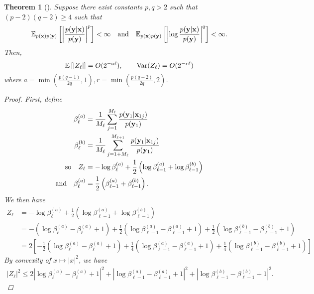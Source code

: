 \documentclass[a4paper, 10pt]{report}
\theoremstyle{plain}
\newtheorem{theorem}{Theorem}[chapter]
\begin{document}
	\begin{theorem}[\citet{goda2020multilevel}]\label{thm:mlmc}
		Suppose there exist constants $p,q>2$ such that $(p-2)(q-2) \ge 4$ such that
		\begin{equation}
		\mathbb{E}_{p({\mathbf{x}})p({\mathbf{y}})}\left[\left|\frac{p({\mathbf{y}}|{\mathbf{x}})}{p({\mathbf{y}})} \right|^p\right]<\infty \quad\text{and}\quad \mathbb{E}_{p({\mathbf{x}})p({\mathbf{y}})}\left[\left|\log \frac{p({\mathbf{y}}|{\mathbf{x}})}{p({\mathbf{y}})} \right|^q\right]<\infty.
		\end{equation}
		Then,
		\begin{equation}
		\mathbb{E}\left[\left|Z_\ell \right|\right] = O(2^{-a\ell}), \qquad \mathrm{Var}(Z_\ell) = O(2^{-r\ell})
		\end{equation}
		where $a = \min\left(\frac{p(q-1)}{2q}, 1 \right), r=\min\left(\frac{p(q-2)}{2q}, 2\right)$.
		\begin{proof}
			First, define
			\begin{align}
			\beta_\ell^{(a)} &= \frac{1}{M_{\ell}} \sum_{j=1}^{M_{\ell}} \frac{p({\mathbf{y}}_1|{\mathbf{x}}_{1j})}{p({\mathbf{y}}_1)} \\
			\beta_\ell^{(b)} &= \frac{1}{M_{\ell}} \sum_{j=1+M_{\ell}}^{M_{\ell+1}} \frac{p({\mathbf{y}}_1|{\mathbf{x}}_{1j})}{p({\mathbf{y}}_1)}\\
			\text{so}\quad Z_\ell &= -\log \beta_\ell^{(a)} + \frac{1}{2}\left(\log \beta_{\ell-1}^{(a)} + \log \beta_{\ell-1}^{(b)}\right) \\
			\text{and}\quad \beta_\ell^{(a)}&= \frac{1}{2}\left(\beta_{\ell-1}^{(a)} + \beta_{\ell-1}^{(b)}\right).
			\end{align}
			We then have
			\begin{align}
			Z_\ell &= -\log \beta_\ell^{(a)} + \frac{1}{2}\left(\log \beta_{\ell-1}^{(a)} + \log \beta_{\ell-1}^{(b)}\right) \\
			&= -\left(\log \beta_\ell^{(a)}-\beta_\ell^{(a)} + 1\right) + \frac{1}{2}\left(\log \beta_{\ell-1}^{(a)}-\beta_{\ell-1}^{(a)} + 1\right) +\frac{1}{2}\left( \log \beta_{\ell-1}^{(b)} - \beta_{\ell-1}^{(b)} + 1\right) \\
			&= 2\left[ -\frac{1}{2}\left(\log \beta_\ell^{(a)}-\beta_\ell^{(a)} + 1\right) + \frac{1}{4}\left(\log \beta_{\ell-1}^{(a)}-\beta_{\ell-1}^{(a)} + 1\right) +\frac{1}{4}\left( \log \beta_{\ell-1}^{(b)} - \beta_{\ell-1}^{(b)} + 1\right)\right]
			\end{align}
			By convexity of $x\mapsto |x|^2$, we have
			\begin{align}
			\label{eq:threebeta}
			|Z_\ell|^2 \le 2\left|\log \beta_\ell^{(a)}-\beta_\ell^{(a)} + 1\right|^2 + \left|\log \beta_{\ell-1}^{(a)}-\beta_{\ell-1}^{(a)} + 1\right|^2 +\left| \log \beta_{\ell-1}^{(b)} - \beta_{\ell-1}^{(b)} + 1\right|^2.

\end{align}
\end{proof}
\end{theorem}
\end{document}
